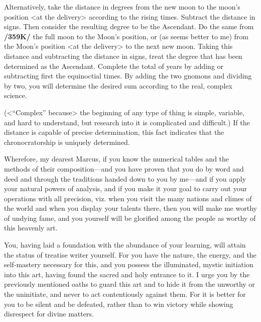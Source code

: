 Alternatively, take the distance in degrees from the new moon to the moon’s position <at the delivery> according to the rising times. Subtract the distance in signs. Then consider the resulting degree
to be the Ascendant. Do the same from \textbf{/359K/} the full moon to the Moon’s position, or (as seems better to me) from the Moon’s position <at the delivery> to the next new moon. Taking this distance and subtracting the distance in signs, treat the degree that has been determined as the Ascendant. Complete the total of years by adding or subtracting first the equinoctial times. By adding the two gnomons and
dividing by two, you will determine the desired sum according to the real, complex science.

(<“Complex” because> the beginning of any type of thing is simple, variable, and hard to understand, but research into it is complicated and difficult.) If the distance is capable of precise determination, this fact
indicates that the chronocratorship is uniquely determined. 

Wherefore, my dearest Marcus, if you know the numerical tables and the methods of their composition—and you have proven that you do by word and deed and through the traditions handed down to you by me—and if you apply your natural powers of analysis, and if you make it your goal to carry out your operations with all precision, viz. when you visit the many nations and climes of the world and when you display your talents there, then you will make me worthy of undying fame, and you yourself will be glorified among the people as worthy of this heavenly art. 

You, having laid a foundation with the abundance of your learning, will attain the status of treatise writer yourself. For you have the nature, the energy, and the self-mastery necessary for this, and you possess the illuminated, mystic initiation into this art, having found the sacred and holy entrance to it. I urge you by the previously mentioned oaths to guard this art and to hide it from the unworthy or the uninitiate, and never to act contentiously against them. For it is better for you to be silent and be defeated, rather than to win victory while showing disrespect for divine matters.
\newpage